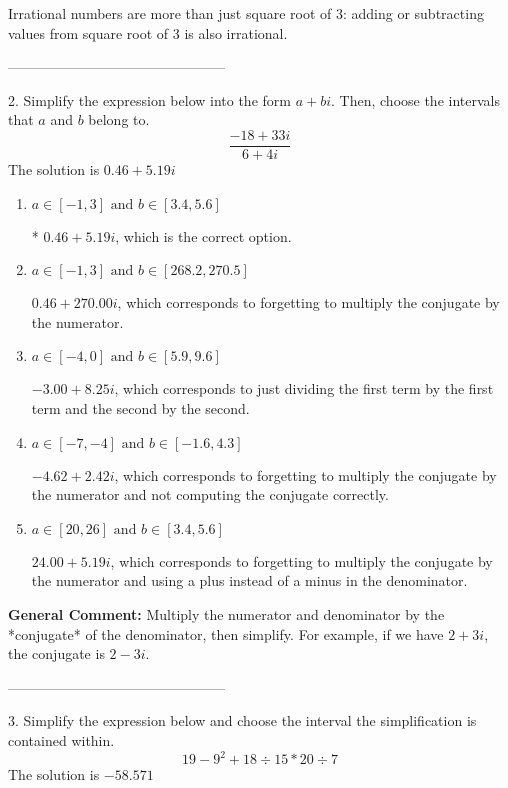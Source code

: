 \documentclass{extbook}[14pt]
\begin{document}
 Irrational numbers are more than just square root of 3: adding or subtracting values from square root of 3 is also irrational. 

-----------------------------------------------

2. Simplify the expression below into the form $a+bi$. Then, choose the intervals that $a$ and $b$ belong to.
\[ \frac{-18 + 33 i}{6 + 4 i} \] 
The solution is $ 0.46  + 5.19 i $ 

\begin{enumerate}[label=\Alph*.] 
\item $ a \in [-1, 3] \text{ and } b \in [3.4, 5.6] $ 

 * $0.46  + 5.19 i$, which is the correct option. 
\item $ a \in [-1, 3] \text{ and } b \in [268.2, 270.5] $ 

  $0.46  + 270.00 i$, which corresponds to forgetting to multiply the conjugate by the numerator. 
\item $ a \in [-4, 0] \text{ and } b \in [5.9, 9.6] $ 

  $-3.00  + 8.25 i$, which corresponds to just dividing the first term by the first term and the second by the second. 
\item $ a \in [-7, -4] \text{ and } b \in [-1.6, 4.3] $ 

  $-4.62  + 2.42 i$, which corresponds to forgetting to multiply the conjugate by the numerator and not computing the conjugate correctly. 
\item $ a \in [20, 26] \text{ and } b \in [3.4, 5.6] $ 

  $24.00  + 5.19 i$, which corresponds to forgetting to multiply the conjugate by the numerator and using a plus instead of a minus in the denominator. 
\end{enumerate} 
 
\textbf{General Comment:} Multiply the numerator and denominator by the *conjugate* of the denominator, then simplify. For example, if we have $2+3i$, the conjugate is $2-3i$. 

-----------------------------------------------

3. Simplify the expression below and choose the interval the simplification is contained within.
\[ 19 - 9^2 + 18 \div 15 * 20 \div 7 \] 
The solution is $ -58.571 $ 
\end{document}
